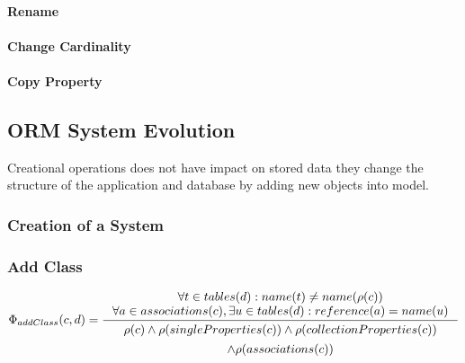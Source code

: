 \documentclass[11pt]{article}
\begin{document}
\paragraph{Rename}
\paragraph{Change Cardinality}
\paragraph{Copy Property}


\subsection{ORM System Evolution}
Creational operations does not have impact on stored data they change the structure of the application and database by adding new objects into model.

\subsubsection{Creation of a System}
\subsubsection{Add Class}

$
\Phi_{addClass}(c, d) = \inference{ \forall t \in tables(d) : name(t) \neq name(\rho(c)) \\
	\forall a \in associations(c), \exists u \in  tables(d) : reference(a) = name(u) 
}{
\begin{gathered}
  \rho(c) \wedge \rho(singleProperties(c)) \wedge \rho(collectionProperties(c)) \\ \wedge \rho(associations(c))
\end{gathered}
}
$
\end{document}
